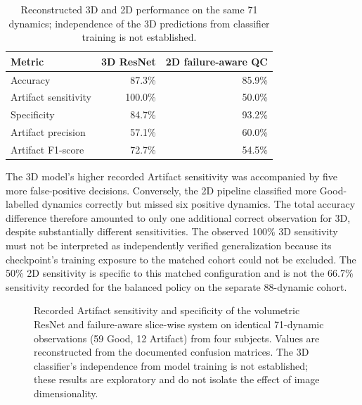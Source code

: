 \begin{table}[htbp]
\centering
\caption{Reconstructed 3D and 2D performance on the same 71 dynamics; independence of the 3D predictions from classifier training is not established.}
\label{tab:results_matched_pipeline_performance}
\begin{tabular}{lrr}
\hline
Metric & 3D ResNet & 2D failure-aware QC \\
\hline
Accuracy & 87.3\% & 85.9\% \\
Artifact sensitivity & 100.0\% & 50.0\% \\
Specificity & 84.7\% & 93.2\% \\
Artifact precision & 57.1\% & 60.0\% \\
Artifact F1-score & 72.7\% & 54.5\% \\
\hline
\end{tabular}
\end{table}

The 3D model's higher recorded Artifact sensitivity was accompanied by five more false-positive decisions. Conversely, the 2D pipeline classified more Good-labelled dynamics correctly but missed six positive dynamics. The total accuracy difference therefore amounted to only one additional correct observation for 3D, despite substantially different sensitivities. The observed 100\% 3D sensitivity must not be interpreted as independently verified generalization because its checkpoint's training exposure to the matched cohort could not be excluded. The 50\% 2D sensitivity is specific to this matched configuration and is not the 66.7\% sensitivity recorded for the balanced policy on the separate 88-dynamic cohort.

\begin{figure}[htbp]
\centering
{}
\caption{Recorded Artifact sensitivity and specificity of the volumetric ResNet and failure-aware slice-wise system on identical 71-dynamic observations (59 Good, 12 Artifact) from four subjects. Values are reconstructed from the documented confusion matrices. The 3D classifier's independence from model training is not established; these results are exploratory and do not isolate the effect of image dimensionality.}
\label{fig:results_matched_3d_2d_reconstructed}
\end{figure}

